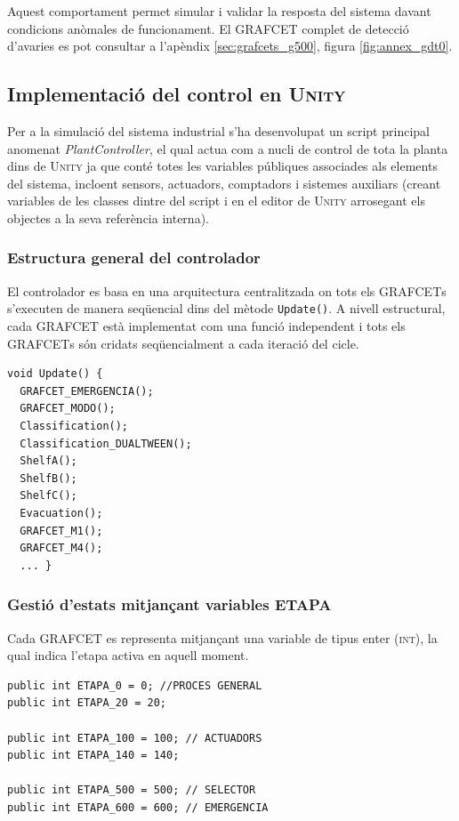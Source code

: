 \documentclass[a4paper,11pt,DIV=13,headings=normal,abstract=true,twoside=semi]{article}
\newcommand{\acro}[1]{\textsc{#1}}
\begin{document}
Aquest comportament permet simular i validar la resposta del sistema davant condicions anòmales de funcionament. El \acro{GRAFCET} complet de detecció d'avaries es pot consultar a l'apèndix \ref{sec:grafcets_g500}, figura \ref{fig:annex_gdt0}.

\subsection{Implementació del control en \acro{Unity}}
Per a la simulació del sistema industrial s'ha desenvolupat un script principal anomenat \emph{PlantController}, el qual actua com a nucli de control de tota la planta dins de \acro{Unity} ja que conté totes les variables públiques associades als elements del sistema, incloent sensors, actuadors, comptadors i sistemes auxiliars (creant variables de les classes dintre del script i en el editor de \acro{Unity} arrosegant els objectes a la seva referència interna).

\subsubsection{Estructura general del controlador}

El controlador es basa en una arquitectura centralitzada on tots els \acro{GRAFCET}s s'executen de manera seqüencial dins del mètode \texttt{Update()}. A nivell estructural, cada \acro{GRAFCET} està implementat com una funció independent i tots els \acro{GRAFCET}s són cridats seqüencialment a cada iteració del cicle. 


\begin{lstlisting}[style=simple]
void Update() {
  GRAFCET_EMERGENCIA();
  GRAFCET_MODO();
  Classification();
  Classification_DUALTWEEN();
  ShelfA();
  ShelfB();
  ShelfC();
  Evacuation();
  GRAFCET_M1();
  GRAFCET_M4();
  ... }
\end{lstlisting}

\subsubsection{Gestió d'estats mitjançant variables ETAPA}

Cada \acro{GRAFCET} es representa mitjançant una variable de tipus enter (\acro{int}), la qual indica l'etapa activa en aquell moment.

\begin{lstlisting}[style=simple]
public int ETAPA_0 = 0; //PROCES GENERAL
public int ETAPA_20 = 20;

public int ETAPA_100 = 100; // ACTUADORS
public int ETAPA_140 = 140; 

public int ETAPA_500 = 500; // SELECTOR
public int ETAPA_600 = 600; // EMERGENCIA
\end{lstlisting}
\end{document}
